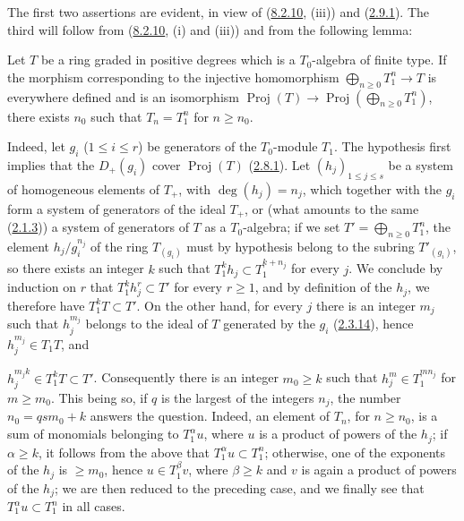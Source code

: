 The first two assertions are evident, in view of
(\hyperref[II.8.2.10]{8.2.10}, (iii)) and
(\hyperref[II.2.9.1]{2.9.1}). The third will follow from
(\hyperref[II.8.2.10]{8.2.10}, (i) and (iii)) and from the following lemma:

\begin{lemma}[8.2.14.1]
\label{II.8.2.14.1}
Let $T$ be a ring graded in positive degrees which is a $T_0$-algebra of finite
type. If the morphism corresponding to the injective homomorphism
$\bigoplus_{n\geq0}T_1^n\to T$ is everywhere defined and is an isomorphism $\operatorname{Proj}(T)\to\operatorname{Proj}\left(\bigoplus_{n\geq0}T_1^n\right)$,
there exists $n_0$ such that $T_n=T_1^n$ for $n\geq n_0$.
\end{lemma}

Indeed, let $g_i$ ($1\leq i\leq r$) be generators of the $T_0$-module
$T_1$. The hypothesis first implies that the $D_+(g_i)$ cover
$\operatorname{Proj}(T)$ (\hyperref[II.2.8.1]{2.8.1}). Let
$(h_j)_{1\leq j\leq s}$ be a system of homogeneous elements of $T_+$, with
$\deg(h_j)=n_j$, which together with the $g_i$ form a system of generators of
the ideal $T_+$, or (what amounts to the same
(\hyperref[II.2.1.3]{2.1.3})) a system of generators of $T$ as a
$T_0$-algebra; if we set $T'=\bigoplus_{n\geq0}T_1^n$, the element
$h_j/g_i^{n_j}$ of the ring $T_{(g_i)}$ must by hypothesis belong to the
subring $T'_{(g_i)}$, so there exists an integer $k$ such that
$T_1^k h_j\subset T_1^{k+n_j}$ for every $j$. We conclude by induction
on $r$ that $T_1^k h_j^r\subset T'$ for every $r\geq1$, and by definition of the
$h_j$, we therefore have $T_1^kT\subset T'$. On the other hand, for every $j$
there is an integer $m_j$ such that $h_j^{m_j}$ belongs to the ideal of $T$ generated by
the $g_i$ (\hyperref[II.2.3.14]{2.3.14}), hence $h_j^{m_j}\in T_1T$, and

$h_j^{m_jk}\in T_1^kT\subset T'$. Consequently there is an integer $m_0\geq k$ such
that $h_j^m\in T_1^{mn_j}$ for $m\geq m_0$. This being so, if $q$ is the
largest of the integers $n_j$, the number $n_0=qsm_0+k$ answers the question.
Indeed, an element of $T_n$, for $n\geq n_0$, is a sum of monomials belonging
to $T_1^\alpha u$, where $u$ is a product of powers of the $h_j$; if
$\alpha\geq k$, it follows from the above that $T_1^\alpha u\subset T_1^n$;
otherwise, one of the exponents of the $h_j$ is $\geq m_0$, hence
$u\in T_1^\beta v$, where $\beta\geq k$ and $v$ is again a product of
powers of the $h_j$; we are then reduced to the preceding case, and we
finally see that $T_1^\alpha u\subset T_1^n$ in all cases.

